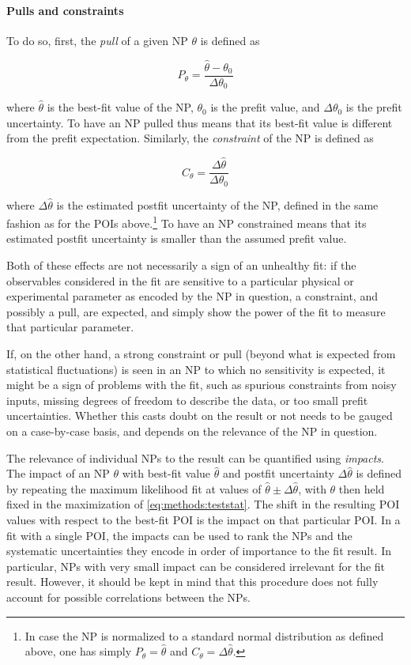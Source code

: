 \paragraph{Pulls and constraints}
To do so, first, the \textit{pull} of a given NP $\theta$ is defined as

\begin{equation}
    P_\theta = \frac{\hat{\theta} - \theta_0} {\Delta \theta_0}
\end{equation}

\noindent where $\hat{\theta}$ is the best-fit value of the NP, $\theta_0$ is the prefit value, and $\Delta \theta_0$ is the prefit uncertainty.  To have an NP pulled thus means that its best-fit value is different from the prefit expectation. Similarly, the \textit{constraint} of the NP is defined as

\begin{equation}
    C_\theta = \frac{\Delta \hat{\theta}} {\Delta \theta_0}
\end{equation}

\noindent where $\Delta \hat{\theta}$ is the estimated postfit uncertainty of the NP, defined in the same fashion as for the POIs above.\footnote{In case the NP is normalized to a standard normal distribution as defined above, one has simply $P_\theta = \hat{\theta}$ and $C_\theta = \Delta \hat{\theta}$.} To have an NP constrained means that its estimated postfit uncertainty is smaller than the assumed prefit value.

Both of these effects are not necessarily a sign of an unhealthy fit: if the observables considered in the fit are sensitive to a particular physical or experimental parameter as encoded by the NP in question, a constraint, and possibly a pull, are expected, and simply show the power of the fit to measure that particular parameter.

If, on the other hand, a strong constraint or pull (beyond what is expected from statistical fluctuations) is seen in an NP to which no sensitivity is expected, it might be a sign of problems with the fit, such as spurious constraints from noisy inputs, missing degrees of freedom to describe the data, or too small prefit uncertainties. Whether this casts doubt on the result or not needs to be gauged on a case-by-case basis, and depends on the relevance of the NP in question.

The relevance of individual NPs to the result can be quantified using \textit{impacts}. The impact of an NP $\theta$ with best-fit value $\hat{\theta}$ and postfit uncertainty $\Delta \hat{\theta}$ is defined by repeating the maximum likelihood fit at values of $\hat{\theta} \pm \Delta \hat{\theta}$, with $\theta$ then held fixed in the maximization of \cref{eq:methods:teststat}. The shift in the resulting POI values with respect to the best-fit POI is the impact on that particular POI. In a fit with a single POI, the impacts can be used to rank the NPs and the systematic uncertainties they encode in order of importance to the fit result. In particular, NPs with very small impact can be considered irrelevant for the fit result. However, it should be kept in mind that this procedure does not fully account for possible correlations between the NPs.

